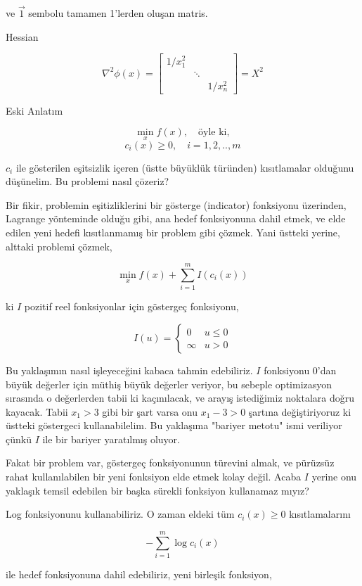 \documentclass[12pt,fleqn]{article}\usepackage{../../common}
\begin{document}
ve $\vec{1}$ sembolu tamamen 1'lerden oluşan matris. 

Hessian

$$
\nabla^2 \phi (x) = \left[\begin{array}{ccc}
1/x_1^2 & & \\
    & \ddots & \\
    & & 1/x_n^2
\end{array}\right] = X^2 
$$

Eski Anlatım

$$
\min_x f(x),  \quad  \textrm{öyle ki}, 
$$
$$
c_i(x) \ge 0, \quad i=1,2,..,m
$$

$c_i$ ile gösterilen eşitsizlik içeren (üstte büyüklük türünden)
kısıtlamalar olduğunu düşünelim. Bu problemi nasıl çözeriz?

Bir fikir, problemin eşitizliklerini bir gösterge (indicator)
fonksiyonu üzerinden, Lagrange yönteminde olduğu gibi, ana hedef
fonksiyonuna dahil etmek, ve elde edilen yeni hedefi kısıtlanmamış bir
problem gibi çözmek. Yani üstteki yerine, alttaki problemi çözmek,

$$
\min_x f(x) + \sum_{i=1}^{m} I(c_i(x))
$$

ki $I$ pozitif reel fonksiyonlar için göstergeç fonksiyonu,

$$
I(u) = 
\left\{ \begin{array}{ll}
0 & u \le 0 \\
\infty & u > 0
\end{array} \right.
$$

Bu yaklaşımın nasıl işleyeceğini kabaca tahmin edebiliriz. $I$ fonksiyonu
0'dan büyük değerler için müthiş büyük değerler veriyor, bu sebeple
optimizasyon sırasında o değerlerden tabii ki kaçınılacak, ve arayış
istediğimiz noktalara doğru kayacak. Tabii $x_1 > 3$ gibi bir şart varsa
onu $x_1 - 3 > 0$ şartına değiştiriyoruz ki üstteki göstergeci
kullanabilelim. Bu yaklaşıma "bariyer metotu" ismi veriliyor çünkü $I$ ile
bir bariyer yaratılmış oluyor.

Fakat bir problem var, göstergeç fonksiyonunun türevini almak, ve pürüzsüz
rahat kullanılabilen bir yeni fonksiyon elde etmek kolay değil. Acaba $I$
yerine onu yaklaşık temsil edebilen bir başka sürekli fonksiyon kullanamaz
mıyız?

Log fonksiyonunu kullanabiliriz. 
O zaman eldeki tüm $c_i(x) \ge 0$ kısıtlamalarını

$$
- \sum_{i=1}^{m} \log c_i(x)
$$

ile hedef fonksiyonuna dahil edebiliriz, yeni birleşik fonksiyon,
\end{document}
